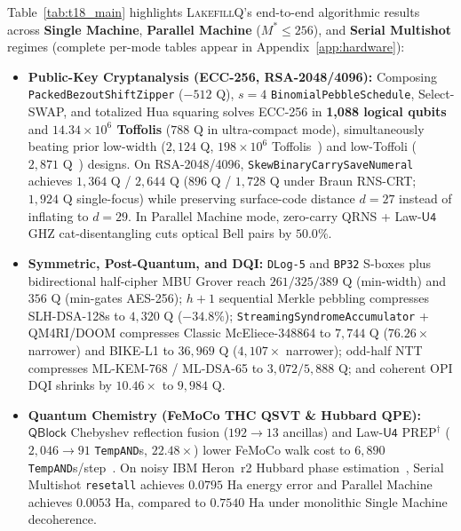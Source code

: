 \documentclass[acmsmall,screen,anonymous]{acmart}
\DeclareRobustCommand{\_}{\ifmmode\text{\char95}\else\char95\penalty0\relax\fi}
\theoremstyle{plain}
\newcommand{\LakefillQ}{\textsc{LakefillQ}}
\newcommand{\QBlock}{\ensuremath{\mathsf{QBlock}}}
\begin{document}
Table~\ref{tab:t18_main} highlights \LakefillQ{}'s end-to-end algorithmic results across \textbf{Single Machine}, \textbf{Parallel Machine} ($M^* \le 256$), and \textbf{Serial Multishot} regimes (complete per-mode tables appear in Appendix~\ref{app:hardware}):
\begin{itemize}
  \item \textbf{Public-Key Cryptanalysis (ECC-256, RSA-2048/4096):} Composing \texttt{PackedBezout\allowbreak ShiftZipper} ($-512\text{ Q}$), $s=4$ \texttt{BinomialPebble\allowbreak Schedule}, Select-SWAP, and totalized Hua squaring solves ECC-256 in \textbf{1,088 logical qubits} and \textbf{$14.34\times 10^6$ Toffolis} ($788\text{ Q}$ in ultra-compact mode), simultaneously beating prior low-width ($2{,}124\text{ Q}$, $198\times 10^6$ Toffolis~\cite{haner2020}) and low-Toffoli ($2{,}871\text{ Q}$~\cite{litinski2023}) designs. On RSA-2048/4096, \texttt{SkewBinary\allowbreak CarrySave\allowbreak Numeral} achieves $1{,}364\text{ Q}$ / $2{,}644\text{ Q}$ ($896\text{ Q}$ / $1{,}728\text{ Q}$ under Braun RNS-CRT; $1{,}924\text{ Q}$ single-focus) while preserving surface-code distance $d=27$ instead of inflating to $d=29$. In Parallel Machine mode, zero-carry QRNS + Law-$\mathsf{U4}$ GHZ cat-disentangling cuts optical Bell pairs by $50.0\%$.
  \item \textbf{Symmetric, Post-Quantum, and DQI:} \texttt{DLog-5} and \texttt{BP32} S-boxes plus bidirectional half-cipher MBU Grover reach $261 / 325 / 389\text{ Q}$ (min-width) and $356\text{ Q}$ (min-gates AES-256); $h+1$ sequential Merkle pebbling compresses SLH-DSA-128s to $4{,}320\text{ Q}$ ($-34.8\%$); \texttt{StreamingSyndrome\allowbreak Accumulator} + QM4RI/DOOM compresses Classic McEliece-348864 to $7{,}744\text{ Q}$ ($76.26\times$ narrower) and BIKE-L1 to $36{,}969\text{ Q}$ ($4{,}107\times$ narrower); odd-half NTT compresses ML-KEM-768 / ML-DSA-65 to $3{,}072 / 5{,}888\text{ Q}$; and coherent OPI DQI shrinks by $10.46\times$ to $9{,}984\text{ Q}$.
  \item \textbf{Quantum Chemistry (FeMoCo THC QSVT \& Hubbard QPE):} $\QBlock$ Chebyshev reflection fusion ($192 \to 13$ ancillas) and Law-$\mathsf{U4}$ $\mathrm{PREP}^\dagger$ ($2{,}046 \to 91$ \texttt{TempAND}s, $22.48\times$) lower FeMoCo walk cost to $6{,}890$ \texttt{TempAND}s/step~\cite{lee2021thc}. On noisy IBM Heron~r2 Hubbard phase estimation~\cite{lintong2022,huangsun2022}, Serial Multishot \texttt{reset\_all} achieves $0.0795\text{ Ha}$ energy error and Parallel Machine achieves $0.0053\text{ Ha}$, compared to $0.7540\text{ Ha}$ under monolithic Single Machine decoherence.
\end{itemize}
\end{document}
